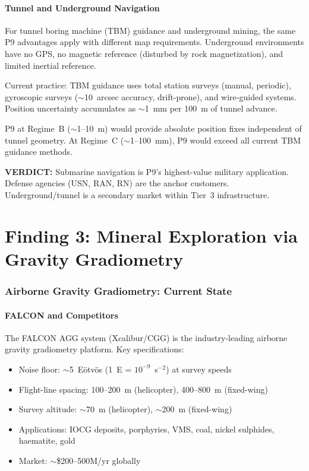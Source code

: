 \documentclass[11pt]{article}
\theoremstyle{definition}
\theoremstyle{remark}
\newcommand{\verdict}[1]{\textcolor{green!50!black}{\textbf{VERDICT:} #1}}
\begin{document}
\subsection{Tunnel and Underground Navigation}

For tunnel boring machine (TBM) guidance and underground mining,
the same P9 advantages apply with different map requirements.
Underground environments have no GPS, no magnetic reference
(disturbed by rock magnetization), and limited inertial reference.

Current practice: TBM guidance uses total station surveys
(manual, periodic), gyroscopic surveys ($\sim$10~arcsec accuracy,
drift-prone), and wire-guided systems. Position uncertainty
accumulates as $\sim$1~mm per 100~m of tunnel advance.

P9 at Regime~B ($\sim$1--10~m) would provide absolute position
fixes independent of tunnel geometry. At Regime~C ($\sim$1--100~mm),
P9 would exceed all current TBM guidance methods.

\verdict{Submarine navigation is P9's highest-value military application.
Defense agencies (USN, RAN, RN) are the anchor customers.
Underground/tunnel is a secondary market within Tier~3 infrastructure.}

\part{Finding 3: Mineral Exploration via Gravity Gradiometry}
\label{part:mineral}

\section{Airborne Gravity Gradiometry: Current State}
\label{sec:agg-current}

\subsection{FALCON and Competitors}

The FALCON AGG system (Xcalibur/CGG) is the industry-leading
airborne gravity gradiometry platform. Key specifications:
\begin{itemize}[nosep]
  \item Noise floor: $\sim$5~E\"otv\"os (1~E = $10^{-9}$~s$^{-2}$)
    at survey speeds
  \item Flight-line spacing: 100--200~m (helicopter), 400--800~m
    (fixed-wing)
  \item Survey altitude: $\sim$70~m (helicopter), $\sim$200~m
    (fixed-wing)
  \item Applications: IOCG deposits, porphyries, VMS, coal,
    nickel sulphides, haematite, gold
  \item Market: $\sim$\$200--500M/yr globally
\end{itemize}
\end{document}
